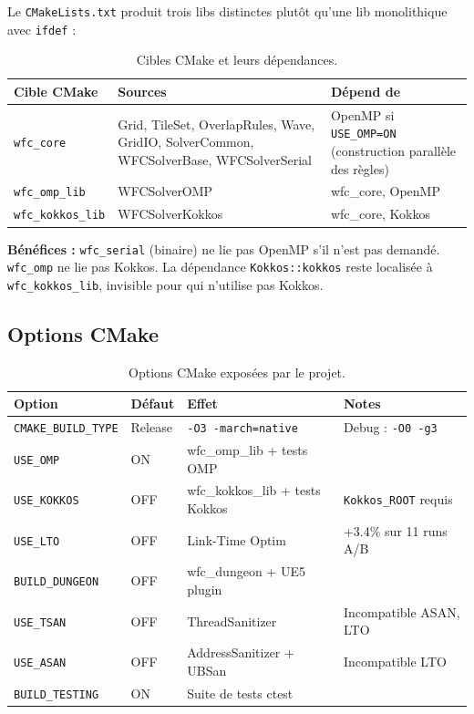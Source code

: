 Le \texttt{CMakeLists.txt} produit trois libs distinctes plutôt qu'une lib monolithique avec \texttt{ifdef} :

\begin{table}[H]
\centering
\small
\begin{tabularx}{\textwidth}{lXX}
\toprule
\textbf{Cible CMake} & \textbf{Sources} & \textbf{Dépend de} \\
\midrule
\texttt{wfc\_core} & Grid, TileSet, OverlapRules, Wave, GridIO, SolverCommon, WFCSolverBase, WFCSolverSerial & OpenMP si \texttt{USE\_OMP=ON} (construction parallèle des règles) \\
\texttt{wfc\_omp\_lib} & WFCSolverOMP & wfc\_core, OpenMP \\
\texttt{wfc\_kokkos\_lib} & WFCSolverKokkos & wfc\_core, Kokkos \\
\bottomrule
\end{tabularx}
\caption{Cibles CMake et leurs dépendances.}
\label{tab:cmake_targets}
\end{table}

\textbf{Bénéfices :} \texttt{wfc\_serial} (binaire) ne lie pas OpenMP s'il n'est pas demandé. \texttt{wfc\_omp} ne lie pas Kokkos. La dépendance \texttt{Kokkos::kokkos} reste localisée à \texttt{wfc\_kokkos\_lib}, invisible pour qui n'utilise pas Kokkos.

\subsection{Options CMake}

\begin{table}[H]
\centering
\small
\begin{tabularx}{\textwidth}{llXX}
\toprule
\textbf{Option} & \textbf{Défaut} & \textbf{Effet} & \textbf{Notes} \\
\midrule
\texttt{CMAKE\_BUILD\_TYPE} & Release & \texttt{-O3 -march=native} & Debug : \texttt{-O0 -g3} \\
\texttt{USE\_OMP} & ON & wfc\_omp\_lib + tests OMP & \\
\texttt{USE\_KOKKOS} & OFF & wfc\_kokkos\_lib + tests Kokkos & \texttt{Kokkos\_ROOT} requis \\
\texttt{USE\_LTO} & OFF & Link-Time Optim & +3.4\% sur 11 runs A/B \\
\texttt{BUILD\_DUNGEON} & OFF & wfc\_dungeon + UE5 plugin & \\
\texttt{USE\_TSAN} & OFF & ThreadSanitizer & Incompatible ASAN, LTO \\
\texttt{USE\_ASAN} & OFF & AddressSanitizer + UBSan & Incompatible LTO \\
\texttt{BUILD\_TESTING} & ON & Suite de tests ctest & \\
\bottomrule
\end{tabularx}
\caption{Options CMake exposées par le projet.}
\label{tab:cmake_options}
\end{table}

